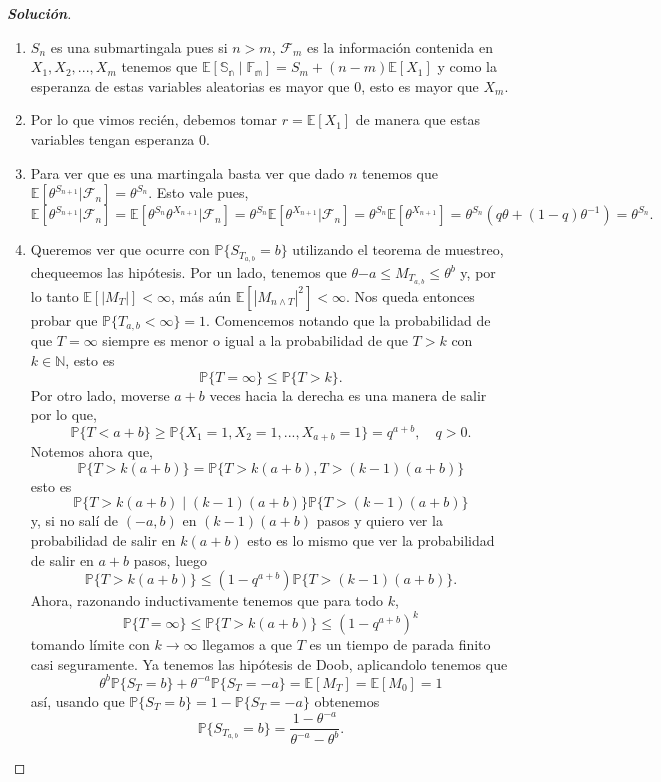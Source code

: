 \documentclass[11pt]{article}
\theoremstyle{ejstyle}
\newenvironment{solucion}
{\begin{proof}[{\bfseries\color{deepindigo} Solución}]}
	{\end{proof}}
\begin{document}
	\newpage
	\begin{solucion} \, \newline
		\begin{enumerate}
			\item $S_n$ es una submartingala pues si $n>m$, $\mathcal{F}_m$ es la información contenida en $X_1, X_2, ..., X_m$ tenemos que $\mathbb{E[S_n \mid F_m]} = S_m + (n-m)\mathbb{E}[X_1]$ y como la esperanza de estas variables aleatorias es mayor que 0, esto es mayor que $X_m.$
			\item Por lo que vimos recién, debemos tomar $r = \mathbb{E}[X_1]$ de manera que estas variables tengan esperanza $0$.
			\item Para ver que es una martingala basta ver que dado $n$ tenemos que $\mathbb{E}[\theta^{S_{n+1}} | \mathcal{F}_n] = \theta^{S_n}$. Esto vale pues,
			$$
				\mathbb{E}[\theta^{S_{n+1}} | \mathcal{F}_n] = \mathbb{E}[\theta^{S_{n}} \theta^{X_{n+1}} | \mathcal{F}_n] = \theta^{S_n} \mathbb{E}[\theta^{X_{n+1}} | \mathcal{F}_n] = \theta^{S_n} \mathbb{E}[\theta^{X_{n+1}}] = \theta^{S_n}(q \theta + (1-q) \theta^{-1} ) = \theta^{S_n}.
			$$
			
			\item Queremos ver que ocurre con $ \mathbb{P}\{S_{T_{a,b}} = b\}$ utilizando el teorema de muestreo, chequeemos las hipótesis. Por un lado, tenemos que $\theta{-a} \leq M_{T_{a,b}} \leq \theta^b$  y, por lo tanto $\mathbb{E}[|M_{T}|] < \infty$, más aún $\mathbb{E}[|M_{n \land T}|^2] < \infty.$ Nos queda entonces probar que $\mathbb{P}\{T_{a,b} < \infty\} = 1.$ Comencemos notando que la probabilidad de que $T = \infty$ siempre es menor o igual a la probabilidad de que $T > k$ con $k \in \mathbb{N}$, esto es
			$$
			\mathbb{P}\{ T = \infty \} \leq \mathbb{P}\{ T > k\}.  
			$$  
			Por otro lado, moverse $a + b$ veces hacia la derecha es una manera de salir por lo que,  
			$$
			\mathbb{P}\{ T < a + b \} \geq \mathbb{P}\{ X_1 = 1, X_2 = 1, ..., X_{a+b} = 1\} = q^{a + b}, \quad q > 0.
			$$
			Notemos ahora que,
			$$
			\mathbb{P}\{ T > k(a + b)\} = \mathbb{P}\{ T > k(a + b), T > (k-1)(a+b)\}
			$$
			esto es
			$$
			\mathbb{P}\{ T > k(a + b) \mid (k - 1)(a+b)\} \mathbb{P}\{ T > (k-1)(a+b)\}
			$$
			y, si no salí de $(-a, b)$ en $(k-1)(a+ b)$ pasos y quiero ver la probabilidad de salir en $k(a+b)$ esto es lo mismo que ver la probabilidad de salir en $a + b$ pasos, luego
			$$
			\mathbb{P}\{ T > k(a + b)\} \leq (1 - q^{a+b}) \mathbb{P}\{ T > (k-1)(a+b)\}.
			$$
			Ahora, razonando inductivamente tenemos que para todo $k$,
			$$
			\mathbb{P}\{ T = \infty \} \leq \mathbb{P}\{ T > k(a + b)\} \leq (1 - q^{a+b})^{k} 
			$$
			tomando límite con $k \to \infty$ llegamos a que $T$ es un tiempo de parada finito casi seguramente. 
			Ya tenemos las hipótesis de Doob, aplicandolo tenemos que
			$$
			\theta^{b} \mathbb{P}\{S_T = b\} + \theta^{-a} \mathbb{P}\{S_T = -a\}= \mathbb{E}[M_{T}] = \mathbb{E}[M_0] = 1
			$$ 
			así, usando que $\mathbb{P}\{S_T= b\} = 1 - \mathbb{P}\{S_T = -a\}$ obtenemos
			$$
			\mathbb{P}\{S_{T_{a, b}} = b\} = \frac{1 - \theta^{-a}}{\theta^{-a} - \theta^{b} }. 
			$$ 
			

\end{enumerate}
\end{solucion}
\end{document}
